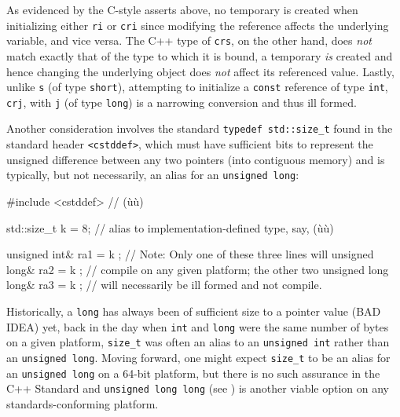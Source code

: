 \noindent As evidenced by the C-style asserts above, no temporary is created when
initializing either \lstinline!ri! or \lstinline!cri! since modifying the
reference affects the underlying variable, and vice versa. The C++ type
of \lstinline!crs!, on the other hand, does \emph{not} match exactly that
of the type to which it is bound, a temporary \emph{is} created and
hence changing the underlying object does \emph{not} affect its
referenced value. Lastly, unlike \lstinline!s! (of type \lstinline!short!),
attempting to initialize a \lstinline!const!  reference of
type \lstinline!int!, \lstinline!crj!, with \lstinline!j! (of type \lstinline!long!)
is a narrowing conversion and thus ill formed.

Another consideration involves the standard
\lstinline!typedef!~\lstinline!std::size_t! found in the standard header
\lstinline!<cstddef>!, which must have sufficient bits to represent the
unsigned difference between any two pointers (into contiguous memory)
and is typically, but not necessarily, an alias for an
\lstinline!unsigned!~\lstinline!long!:

\begin{emcppshiddenlisting}[emcppsbatch=e10]
#include <cstddef>  // (ù{}ù)
\end{emcppshiddenlisting}
\begin{emcppslisting}[emcppsbatch=e10,emcppserrorlines={3,4,5}]
std::size_t k = 8;  // alias to implementation-defined type, say, (ù{}ù)

unsigned int&       ra1 = { k };  // Note: Only one of these three lines will
unsigned long&      ra2 = { k };  // compile on any given platform; the other two
unsigned long long& ra3 = { k };  // will necessarily be ill formed and not compile.
\end{emcppslisting}
    

\noindent Historically, a \lstinline!long! has always been of sufficient size to
 a pointer value (BAD IDEA) yet, back in the day when
\lstinline!int! and \lstinline!long! were the same number of bytes on a given
platform, \lstinline!size_t! was often an alias to an
\lstinline!unsigned!~\lstinline!int! rather than an
\lstinline!unsigned!~\lstinline!long!. Moving forward, one might expect
\lstinline!size_t! to be an alias for an \lstinline!unsigned!~\lstinline!long!
on a 64-bit platform, but there is no such assurance in the C++ Standard
and \lstinline!unsigned!~\lstinline!long!~\lstinline!long! (see
) is another viable option on
any standards-conforming platform.

